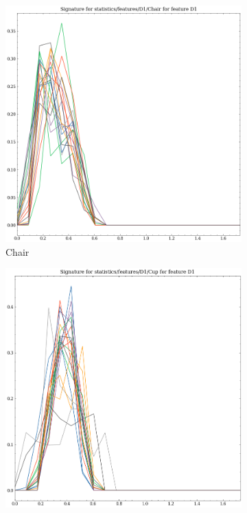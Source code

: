 \begin{figure}[t!p]
    
    \begin{subfigure}[b]{0.23\textwidth}
        \includegraphics[width=\textwidth]{assets/feature_extraction/D1/Chair.png}
        \caption{Chair}
        \label{fig:features-statistics-D1-i}    
    \end{subfigure}
    \hfill
    \begin{subfigure}[b]{0.23\textwidth}
        \includegraphics[width=\textwidth]{assets/feature_extraction/D1/Cup.png}

\end{subfigure}
\end{figure}

